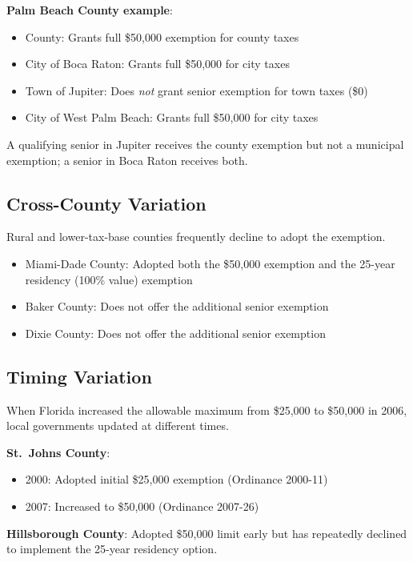 \documentclass[11pt]{article}
\begin{document}
\textbf{Palm Beach County example}:
\begin{itemize}
    \item County: Grants full \$50,000 exemption for county taxes
    \item City of Boca Raton: Grants full \$50,000 for city taxes
    \item Town of Jupiter: Does \textit{not} grant senior exemption for town taxes (\$0)
    \item City of West Palm Beach: Grants full \$50,000 for city taxes
\end{itemize}

A qualifying senior in Jupiter receives the county exemption but not a municipal exemption; a senior in Boca Raton receives both.

\subsection{Cross-County Variation}

Rural and lower-tax-base counties frequently decline to adopt the exemption.

\begin{itemize}
    \item Miami-Dade County: Adopted both the \$50,000 exemption and the 25-year residency (100\% value) exemption
    \item Baker County: Does not offer the additional senior exemption
    \item Dixie County: Does not offer the additional senior exemption
\end{itemize}

\subsection{Timing Variation}

When Florida increased the allowable maximum from \$25,000 to \$50,000 in 2006, local governments updated at different times.

\textbf{St.\ Johns County}:
\begin{itemize}
    \item 2000: Adopted initial \$25,000 exemption (Ordinance 2000-11)
    \item 2007: Increased to \$50,000 (Ordinance 2007-26)
\end{itemize}

\textbf{Hillsborough County}: Adopted \$50,000 limit early but has repeatedly declined to implement the 25-year residency option.
\end{document}
